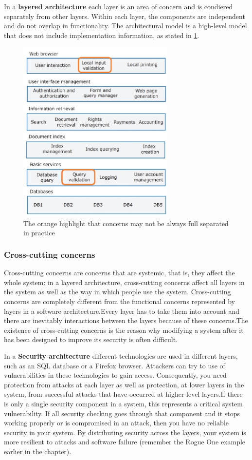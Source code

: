 \documentclass[10pt,a4paper]{report}
\begin{document}
In a \textbf{layered architecture} each layer is an area of concern and is condiered separately from other layers. Within each layer, the components are independent and do not overlap in functionality. The architectural model is a high-level model that does not include implementation information, as stated in \ref{image28}.
 \begin{figure}[h]
	\centering
	\includegraphics[width=0.7\textwidth]{image28}
	\caption{The orange highlight that concerns may not be always full separated in practice}
	\label{image28}
\end{figure}

\subsubsection{Cross-cutting concerns}
Cross-cutting concerns are concerns that are systemic, that is, they affect
the whole system: in a layered architecture, cross-cutting concerns affect all layers in the system as well as the way in which people use the system.
Cross-cutting concerns are completely different from the functional concerns represented by layers in a software architecture.Every layer has to take them into account and there are inevitably
interactions between the layers because of these concerns.The existence of cross-cutting concerns is the reason why modifying a system after it has been designed to improve its security is often difficult.


In a \textbf{Security architecture} different technologies are used in different layers, such as an SQL database or a Firefox browser. Attackers can try to use of vulnerabilities in these technologies to
gain access. Consequently, you need protection from attacks at each layer as well as protection, at lower layers in the system, from successful attacks that have occurred at higher-level layers.If there is only a single security component in a system, this represents a critical system vulnerability. If all security checking goes through that component and it stops working properly or is compromised in an attack, then you have no reliable security in your system.
By distributing security across the layers, your system is more resilient to attacks and software failure (remember the Rogue One example earlier in the chapter).
\end{document}
